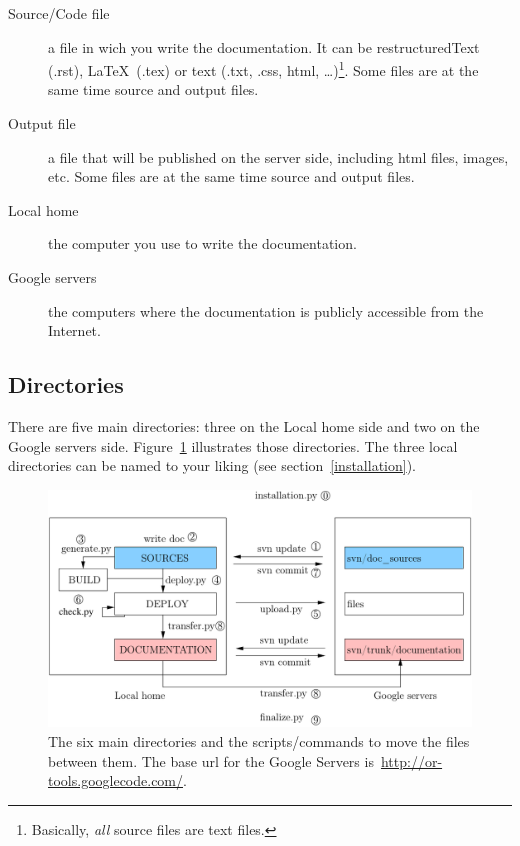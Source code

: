 \documentclass[a4paper,10pt]{article}
\begin{document}
\begin{description}
 \item[Source/Code file] a file in wich you write the documentation. It can be restructuredText (.rst), \LaTeX\ (.tex) or text (.txt, .css, html, \ldots)\footnote{Basically, \emph{all} source files are text files.}. Some files are at the same time source and output files.
 \item[Output file] a file that will be published on the server side, including html files, images, etc. Some files are at the same time source and output files.
 \item[Local home] the computer you use to write the documentation.
 \item[Google servers] the computers where the documentation is publicly accessible from the Internet. 
\end{description}

\subsection{Directories}

There are five main directories: three on the Local home side and two on the Google servers side. Figure~\ref{pic_directories} illustrates those directories. The three local directories can be named to your liking (see section~\ref{installation}).

\begin{figure}[h]
   \centering
   \includegraphics[scale=0.8]{images/directories.pdf}
   \caption{The six main directories and the scripts/commands to move the files between them. The base url for the Google Servers is~\href{http://or-tools.googlecode.com/}{http://or-tools.googlecode.com/}.}\label{pic_directories}
 \end{figure}
 
\end{document}
